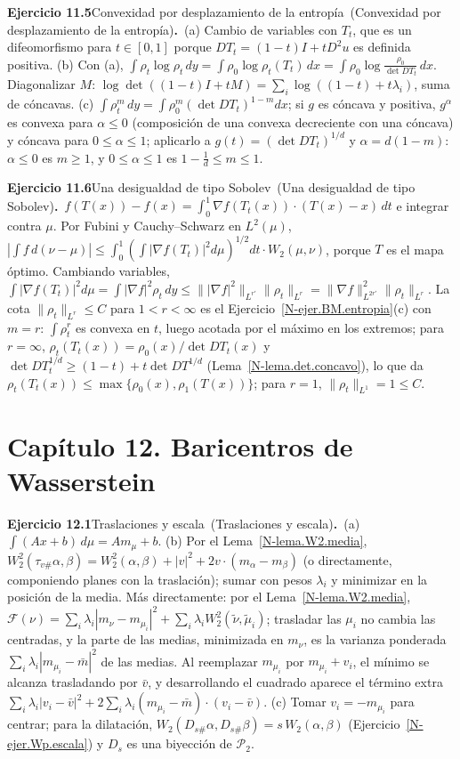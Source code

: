 \documentclass[11pt,a4paper]{amsart}
\theoremstyle{remark}
\theoremstyle{definition}
\numberwithin{subsection}{section}
\numberwithin{equation}{section}
\newcommand{\ejlabel}[2]{\par\medskip\noindent\textbf{Ejercicio #1}\ifx\relax#2\relax\else\ (#2)\fi\textbf{.}\ }
\begin{document}
\ejlabel{11.5}{Convexidad por desplazamiento de la entropía}(a) Cambio de variables con $T_t$, que es un difeomorfismo para $t\in[0,1]$ porque $DT_t=(1-t)I+tD^2u$ es definida positiva. (b) Con (a), $\int\rho_t\log\rho_t\,dy=\int\rho_0\log\rho_t(T_t)\,dx=\int\rho_0\log\frac{\rho_0}{\det DT_t}\,dx$. Diagonalizar $M$: $\log\det((1-t)I+tM)=\sum_i\log((1-t)+t\lambda_i)$, suma de cóncavas. (c) $\int\rho_t^m\,dy=\int\rho_0^m(\det DT_t)^{1-m}dx$; si $g$ es cóncava y positiva, $g^\alpha$ es convexa para $\alpha\le0$ (composición de una convexa decreciente con una cóncava) y cóncava para $0\le\alpha\le1$; aplicarlo a $g(t)=(\det DT_t)^{1/d}$ y $\alpha=d(1-m)$: $\alpha\le0$ es $m\ge1$, y $0\le\alpha\le1$ es $1-\frac1d\le m\le1$.

\ejlabel{11.6}{Una desigualdad de tipo Sobolev}$f(T(x))-f(x)=\int_0^1\nabla f(T_t(x))\cdot(T(x)-x)\,dt$ e integrar contra $\mu$. Por Fubini y Cauchy--Schwarz en $L^2(\mu)$, $|\int f\,d(\nu-\mu)|\le\int_0^1(\int|\nabla f(T_t)|^2d\mu)^{1/2}dt\cdot W_2(\mu,\nu)$, porque $T$ es el mapa óptimo. Cambiando variables, $\int|\nabla f(T_t)|^2d\mu=\int|\nabla f|^2\rho_t\,dy\le\||\nabla f|^2\|_{L^{r'}}\|\rho_t\|_{L^r}=\|\nabla f\|_{L^{2r'}}^2\|\rho_t\|_{L^r}$. La cota $\|\rho_t\|_{L^r}\le C$ para $1<r<\infty$ es el Ejercicio~\ref{N-ejer.BM.entropia}(c) con $m=r$: $\int\rho_t^r$ es convexa en $t$, luego acotada por el máximo en los extremos; para $r=\infty$, $\rho_t(T_t(x))=\rho_0(x)/\det DT_t(x)$ y $\det DT_t^{1/d}\ge(1-t)+t\det DT^{1/d}$ (Lema~\ref{N-lema.det.concavo}), lo que da $\rho_t(T_t(x))\le\max\{\rho_0(x),\rho_1(T(x))\}$; para $r=1$, $\|\rho_t\|_{L^1}=1\le C$.

\section*{Capítulo 12. Baricentros de Wasserstein}
\ejlabel{12.1}{Traslaciones y escala}(a) $\int(Ax+b)\,d\mu=Am_\mu+b$. (b) Por el Lema~\ref{N-lema.W2.media}, $W_2^2(\tau_{v\#}\alpha,\beta)=W_2^2(\alpha,\beta)+|v|^2+2v\cdot(m_\alpha-m_\beta)$ (o directamente, componiendo planes con la traslación); sumar con pesos $\lambda_i$ y minimizar en la posición de la media. Más directamente: por el Lema~\ref{N-lema.W2.media}, $\mathcal F(\nu)=\sum_i\lambda_i|m_\nu-m_{\mu_i}|^2+\sum_i\lambda_iW_2^2(\tilde\nu,\tilde\mu_i)$; trasladar las $\mu_i$ no cambia las centradas, y la parte de las medias, minimizada en $m_\nu$, es la varianza ponderada $\sum_i\lambda_i|m_{\mu_i}-\bar m|^2$ de las medias. Al reemplazar $m_{\mu_i}$ por $m_{\mu_i}+v_i$, el mínimo se alcanza trasladando por $\bar v$, y desarrollando el cuadrado aparece el término extra $\sum_i\lambda_i|v_i-\bar v|^2+2\sum_i\lambda_i(m_{\mu_i}-\bar m)\cdot(v_i-\bar v)$. (c) Tomar $v_i=-m_{\mu_i}$ para centrar; para la dilatación, $W_2(D_{s\#}\alpha,D_{s\#}\beta)=s\,W_2(\alpha,\beta)$ (Ejercicio~\ref{N-ejer.Wp.escala}) y $D_s$ es una biyección de $\mathcal P_2$.
\end{document}
